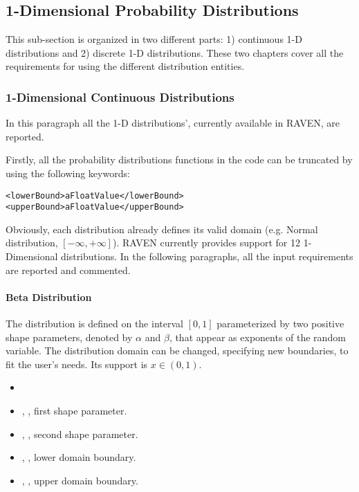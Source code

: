 \subsection{1-Dimensional Probability Distributions}
\label{subsec:1dDist}
This sub-section is organized in two different parts: 1) continuous 1-D
distributions and 2) discrete 1-D distributions.
These two chapters cover all the requirements for using the different
distribution entities. 
\subsubsection{1-Dimensional Continuous Distributions}
\label{subsubsec:1DContinuous}
In this paragraph all the 1-D distributions', currently available in RAVEN, are
reported.

Firstly, all the probability distributions functions in the code can be
truncated by using the following keywords:
\begin{lstlisting}[style=XML]
<lowerBound>aFloatValue</lowerBound>
<upperBound>aFloatValue</upperBound>
\end{lstlisting}
Obviously, each distribution already defines its valid domain (e.g. Normal
distribution, $[-\infty,+\infty]$). 
%
RAVEN currently provides support for 12 1-Dimensional distributions.
%
In the following paragraphs, all the input requirements are reported and
commented.

\paragraph{Beta Distribution}
\label{Beta}
The  distribution is defined on the
interval $[0,1]$ parameterized by two positive shape parameters, denoted by
$\alpha$ and $\beta$, that appear as exponents of the random variable.
%
The distribution domain can be changed, specifying new boundaries, to fit the
user's needs.
%
Its support is $x \in (0, 1)$.

%
\attrIntro
\vspace{-5mm}
\begin{itemize}
\itemsep0em
\item \nameDescription
\end{itemize}
\vspace{-5mm}
\subnodesIntro
\begin{itemize}
\item {}, , first shape
  parameter.
\item {}, , second shape
  parameter.
\item {}, , lower domain boundary.  
\item {}, , upper domain
  boundary.
\end{itemize}

